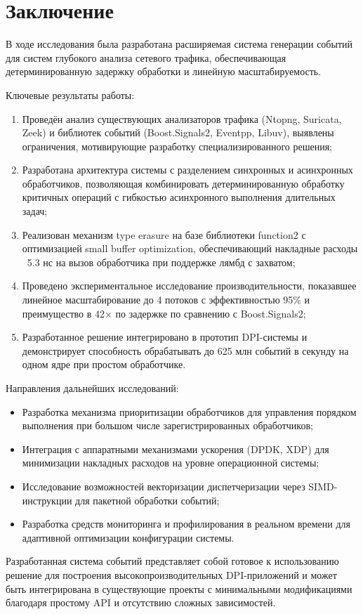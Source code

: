 \documentclass[12pt,a4paper]{report}
\begin{document}
\chapter{Заключение}
В ходе исследования была разработана расширяемая система генерации событий для систем глубокого анализа сетевого трафика, обеспечивающая детерминированную задержку обработки и линейную масштабируемость.

Ключевые результаты работы:
\begin{enumerate}
    \item Проведён анализ существующих анализаторов трафика (Ntopng, Suricata, Zeek) и библиотек событий (Boost.Signals2, Eventpp, Libuv), выявлены ограничения, мотивирующие разработку специализированного решения;

    \item Разработана архитектура системы с разделением синхронных и асинхронных обработчиков, позволяющая комбинировать детерминированную обработку критичных операций с гибкостью асинхронного выполнения длительных задач;

    \item Реализован механизм type erasure на базе библиотеки function2 с оптимизацией small buffer optimization, обеспечивающий накладные расходы ~5.3 нс на вызов обработчика при поддержке лямбд с захватом;

    \item Проведено экспериментальное исследование производительности, показавшее линейное масштабирование до 4 потоков с эффективностью 95\% и преимущество в 42× по задержке по сравнению с Boost.Signals2;

    \item Разработанное решение интегрировано в прототип DPI-системы и демонстрирует способность обрабатывать до 625 млн событий в секунду на одном ядре при простом обработчике.
\end{enumerate}

Направления дальнейших исследований:
\begin{itemize}
    \item Разработка механизма приоритизации обработчиков для управления порядком выполнения при большом числе зарегистрированных обработчиков;
    \item Интеграция с аппаратными механизмами ускорения (DPDK, XDP) для минимизации накладных расходов на уровне операционной системы;
    \item Исследование возможностей векторизации диспетчеризации через SIMD-инструкции для пакетной обработки событий;
    \item Разработка средств мониторинга и профилирования в реальном времени для адаптивной оптимизации конфигурации системы.
\end{itemize}

Разработанная система событий представляет собой готовое к использованию решение для построения высокопроизводительных DPI-приложений и может быть интегрирована в существующие проекты с минимальными модификациями благодаря простому API и отсутствию сложных зависимостей.

\printbibliography[title={Список литературы}]
\end{document}
